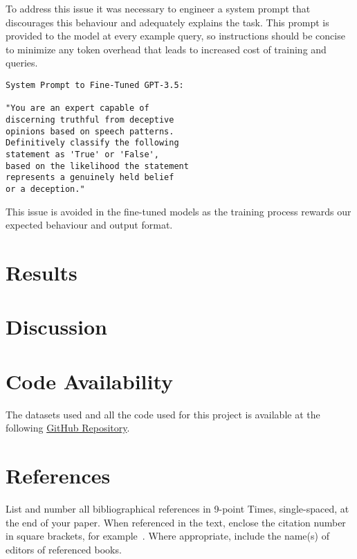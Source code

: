 \documentclass[10pt,twocolumn,letterpaper]{article}
\begin{document}
To address this issue it was necessary to engineer a system prompt that
discourages this behaviour and adequately explains the task. This prompt
is provided to the model at every example query, so instructions should
be concise to minimize any token overhead that leads to increased cost of
training and queries.

\begin{verbatim}
System Prompt to Fine-Tuned GPT-3.5:

"You are an expert capable of
discerning truthful from deceptive
opinions based on speech patterns. 
Definitively classify the following 
statement as 'True' or 'False', 
based on the likelihood the statement
represents a genuinely held belief 
or a deception."
\end{verbatim}

This issue is avoided in the fine-tuned models as the training process
rewards our expected behaviour and output format.



\section{Results}

\section{Discussion}

\section{Code Availability}
The datasets used and all the code used for this project is available
at the following \href{https://github.com/TannerAGraves/GPT-LieDetection/}{GitHub Repository}.


\section{References}

List and number all bibliographical references in 9-point Times,
single-spaced, at the end of your paper. When referenced in the text,
enclose the citation number in square brackets, for
example~\cite{Authors14}.  Where appropriate, include the name(s) of
editors of referenced books.

{\small


}
\end{document}
